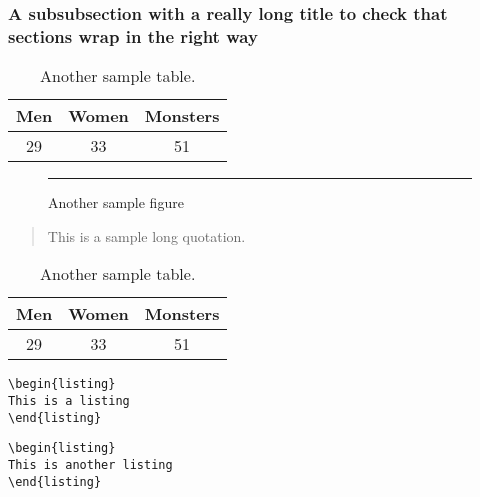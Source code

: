 \documentclass[lscape]{msu-thesis}
\begin{document}
\subsubsection{A subsubsection with a really long title to check that sections wrap in the right way}
\begin{table}
\centering
\begin{tabular}{ccc}
\toprule
Men & Women & Monsters\\
\midrule
29 & 33 & 51\\
\bottomrule
\end{tabular}
\caption{Another sample table.}
\end{table}
\lipsum[7]
\begin{exe}
\ex\label{2}
\begin{xlist}
\end{xlist}
\end{exe}
\begin{figure}
\centering
{\color{gray!40}\rule{4in}{2in}}
\caption{Another sample figure}
\end{figure}
\lipsum[2]
\begin{quote}
\SingleSpacing
This is a sample long quotation. \lipsum[2]

\hfill{\citep{Munn1999}}
\end{quote}
\begin{table}
\centering
\begin{tabular}{ccc}
\toprule
Men & Women & Monsters\\
\midrule
29 & 33 & 51\\
\bottomrule
\end{tabular}
\caption{Another sample table.}
\end{table}
\begin{listing}
\begin{lstlisting}
\begin{listing}
This is a listing
\end{listing}
\end{lstlisting}
\caption{A listing caption}
\end{listing}
\begin{listing}
\begin{lstlisting}
\begin{listing}
This is another listing
\end{listing}
\end{lstlisting}
\caption{Another listing caption}
\end{listing}
\lipsum[8]
\end{document}

